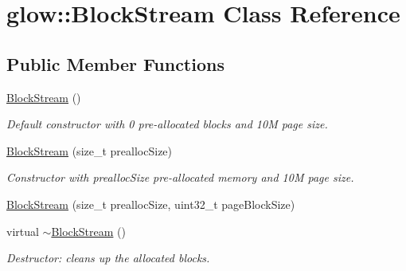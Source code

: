 \hypertarget{classglow_1_1_block_stream}{}\section{glow\+:\+:Block\+Stream Class Reference}
\label{classglow_1_1_block_stream}
\subsection*{Public Member Functions}
\begin{DoxyCompactItemize}
\item 
\mbox{\label{classglow_1_1_block_stream_a8d0906ce90a3968c890e862530529b02}} 
\hyperlink{classglow_1_1_block_stream_a8d0906ce90a3968c890e862530529b02}{Block\+Stream} ()
\begin{DoxyCompactList}\small\item\em Default constructor with 0 pre-\/allocated blocks and 10M page size. \end{DoxyCompactList}\item 
\mbox{\label{classglow_1_1_block_stream_a43918f020651986b2b4de87cdb91ae05}} 
\hyperlink{classglow_1_1_block_stream_a43918f020651986b2b4de87cdb91ae05}{Block\+Stream} (size\+\_\+t prealloc\+Size)
\begin{DoxyCompactList}\small\item\em Constructor with prealloc\+Size pre-\/allocated memory and 10M page size. \end{DoxyCompactList}\item 
\hyperlink{classglow_1_1_block_stream_a2477bdde2366295d7a27087a011b824b}{Block\+Stream} (size\+\_\+t prealloc\+Size, uint32\+\_\+t page\+Block\+Size)
\item 
\mbox{\label{classglow_1_1_block_stream_a5ce14cfac41c176c37d797907b1c0dcd}} 
virtual \hyperlink{classglow_1_1_block_stream_a5ce14cfac41c176c37d797907b1c0dcd}{$\sim$\+Block\+Stream} ()
\begin{DoxyCompactList}\small\item\em Destructor\+: cleans up the allocated blocks. \end{DoxyCompactList}\item 
\mbox{\label{classglow_1_1_block_stream_a6d35d45098e2794047d318602028ce77}} 

\end{DoxyCompactItemize}
